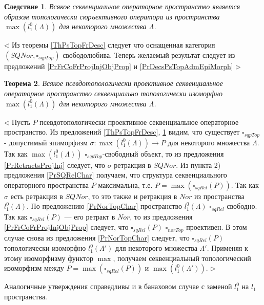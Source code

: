 \documentclass[12pt]{article}
\newtheorem{theorem}{Теорема}[subsection]
\newtheorem{corollary}[theorem]{Следствие}
\newenvironment{proof}{\par $\triangleleft$}{$\triangleright$}
\begin{document}
\begin{corollary}\label{CorSQSpaceIsImgPsTopAdmEpiMorph}
Всякое секвенциальное операторное пространство является образом топологически сюръективного оператора из пространства $\max(l_1^0(\Lambda))$ для некоторого множества $\Lambda$.
\end{corollary}
\begin{proof}	
Из теоремы \ref{ThPsTopFrDesc} следует что оснащенная категория $(SQNor,\square_{sqpTop})$ свободолюбива. Теперь желаемый результат следует из предложений \ref{PrFrCoFrProjInjObjProp} и \ref{PrDecsPsTopAdmEpiMorph}
\end{proof}

\begin{theorem}\label{ThPsTopProjDesc}
Всякое псевдотопологически проективное секвенциальное операторное пространство секвенциально топологически изоморфно $\max(l_1^0(\Lambda))$ для некоторого множества $\Lambda$.
\end{theorem}
\begin{proof}
Пусть $P$ псевдотопологически проективное секвенциальное операторное пространство. 
Из предложений \ref{ThPsTopFrDesc}, \ref{CorSQSpaceIsImgPsTopAdmEpiMorph} видим, что существует $\square_{sqpTop}$ - допустимый эпиморфизм $\sigma:\max(l_1^0(\Lambda))\to P$ для некоторого множества $\Lambda$. Так как $\max(l_1^0(\Lambda))$ $\square_{sqpTop}$-свободный объект, то из предложения \ref{PrRetractsProjInj} следует, что $\sigma$ ретракция в $SQNor$. Из пункта 2) предложения \ref{PrSQRelChar} получаем, 
что структура секвенциального операторного пространства $P$ максимальна, т.е. $P=\max(\square_{sqRel}(P))$. Так как $\sigma$ есть ретракция в $SQNor$, то это также и ретракция в $Nor$ из пространства $l_1^0(\Lambda)$. По предложению \ref{PrNorTopChar} пространство $l_1^0(\Lambda)$ $\square_{sqRel}$-свободно. Так как $\square_{sqRel}(P)$ --- его ретракт в $Nor$, то из предложения 
\ref{PrFrCoFrProjInjObjProp} следует, что $\square_{sqRel}(P)$ $\square_{norTop}$-проективен. В этом случае снова из предложения \ref{PrNorTopChar} следует, что $\square_{sqRel}(P)$ топологически изоморфно 
$l_1^0(\Lambda')$ для некоторого множества $\Lambda'$. Применяя к этому изоморфизму функтор $\max$, получаем секвенциальный топологический изоморфизм между $P=\max(\square_{sqRel}(P))$ и $\max(l_1^0(\Lambda'))$.
\end{proof}

Аналогичные утверждения справедливы и в банаховом случае с заменой $l_1^0$  на $l_1$ пространства.
\end{document}
